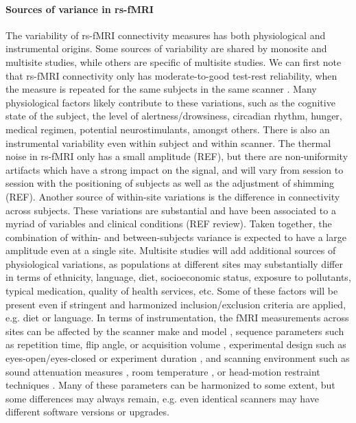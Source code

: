 \documentclass[authoryear]{elsarticle}
\begin{document}
\paragraph{Sources of variance in rs-fMRI}
The variability of rs-fMRI connectivity measures has both physiological and instrumental origins. Some sources of variability are shared by monosite and multisite studies, while others are specific of multisite studies. We can first note that rs-fMRI connectivity only has moderate-to-good test-rest reliability, when the measure is repeated for the same subjects in the same scanner \citep{Shehzad2009}. Many physiological factors likely contribute to these variations, such as the cognitive state of the subject, the level of alertness/drowsiness, circadian rhythm, hunger, medical regimen, potential neurostimulants, amongst others. There is also an instrumental variability even within subject and within scanner. The thermal noise in rs-fMRI only has a small amplitude (REF), but there are non-uniformity artifacts which have a strong impact on the signal, and will vary from session to session with the positioning of subjects as well as the adjustment of shimming (REF). Another source of within-site variations is the difference in connectivity across subjects. These variations are substantial and have been associated to a myriad of variables and clinical conditions (REF review). Taken together, the combination of within- and between-subjects variance is expected to have a large amplitude even at a single site. Multisite studies will add additional sources of physiological variations, as populations at different sites may substantially differ in terms of ethnicity, language, diet, socioeconomic status, exposure to pollutants, typical medication, quality of health services, etc. Some of these factors will be present even if stringent and harmonized inclusion/exclusion criteria are applied, e.g. diet or language. In terms of instrumentation, the fMRI measurements across sites can be affected by the scanner make and model \citep{Friedman2006}, sequence parameters such as repetition time, flip angle, or acquisition volume \citep{Friedman2006a}, experimental design such as eyes-open/eyes-closed \citep{Yan2009} or experiment duration \citep{VanDijk2010}, and scanning environment such as sound attenuation measures \citep{Elliott1999}, room temperature \citep{Vanhoutte2006}, or head-motion restraint techniques \citep{Edward2000}. Many of these parameters can be harmonized to some extent, but some differences may always remain, e.g. even identical scanners may have different software versions or upgrades.
\end{document}
